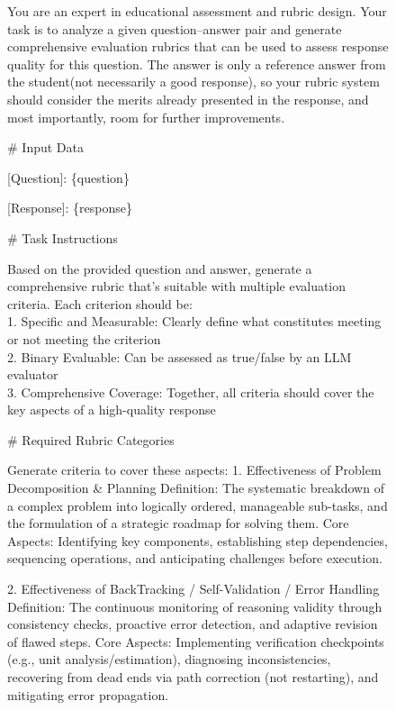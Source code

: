 \begin{figure}[ht]
    \centering
    \begin{lrbox}{\DSRPrompt}
    \begin{gptpromptbox}
    \begin{minipage}{0.95\linewidth}
    \raggedright
    \scriptsize\ttfamily
\setlength{\baselineskip}{1\baselineskip}
You are an expert in educational assessment and rubric design.
Your task is to analyze a given question–answer pair and generate comprehensive evaluation rubrics that can be used to assess response quality for this question. The answer is only a reference answer from the student(not necessarily a good response), so your rubric system should consider the merits already presented in the response, and most importantly, room for further improvements.

\# Input Data

[Question]:
\{question\}

[Response]:
\{response\}


\# Task Instructions

Based on the provided question and answer, generate a comprehensive rubric that's suitable with multiple evaluation criteria. Each criterion should be:\\
1. Specific and Measurable: Clearly define what constitutes meeting or not meeting the criterion\\
2. Binary Evaluable: Can be assessed as true/false by an LLM evaluator\\
3. Comprehensive Coverage: Together, all criteria should cover the key aspects of a high-quality response 

\# Required Rubric Categories

Generate criteria to cover these aspects:
1. Effectiveness of Problem Decomposition \& Planning
Definition: The systematic breakdown of a complex problem into logically ordered, manageable sub-tasks, and the formulation of a strategic roadmap for solving them.
Core Aspects: Identifying key components, establishing step dependencies, sequencing operations, and anticipating challenges before execution.

2. Effectiveness of BackTracking / Self-Validation / Error Handling
Definition: The continuous monitoring of reasoning validity through consistency checks, proactive error detection, and adaptive revision of flawed steps.
Core Aspects: Implementing verification checkpoints (e.g., unit analysis/estimation), diagnosing inconsistencies, recovering from dead ends via path correction (not restarting), and mitigating error propagation.


\end{minipage}
\end{gptpromptbox}
\end{lrbox}
\end{figure}
